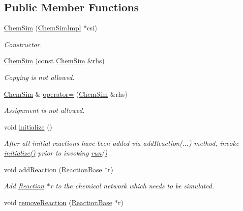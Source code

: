 \subsection*{Public Member Functions}
\begin{DoxyCompactItemize}
\item 
\hyperlink{classchem_1_1ChemSim_a650a80164d4545c984feae82929ea6d6}{Chem\-Sim} (\hyperlink{classchem_1_1ChemSimImpl}{Chem\-Sim\-Impl} $\ast$csi)
\begin{DoxyCompactList}\small\item\em Constructor. \end{DoxyCompactList}\item 
\hyperlink{classchem_1_1ChemSim_a3913850f42c21b7d047b4516bab90293}{Chem\-Sim} (const \hyperlink{classchem_1_1ChemSim}{Chem\-Sim} \&rhs)
\begin{DoxyCompactList}\small\item\em Copying is not allowed. \end{DoxyCompactList}\item 
\hyperlink{classchem_1_1ChemSim}{Chem\-Sim} \& \hyperlink{classchem_1_1ChemSim_a80f99f736b36adacb3888052f6ab933d}{operator=} (\hyperlink{classchem_1_1ChemSim}{Chem\-Sim} \&rhs)
\begin{DoxyCompactList}\small\item\em Assignment is not allowed. \end{DoxyCompactList}\item 
void \hyperlink{classchem_1_1ChemSim_a691cc53afccbda480a674b7f3014ac72}{initialize} ()
\begin{DoxyCompactList}\small\item\em After all initial reactions have been added via add\-Reaction(...) method, invoke \hyperlink{classchem_1_1ChemSim_a691cc53afccbda480a674b7f3014ac72}{initialize()} prior to invoking \hyperlink{classchem_1_1ChemSim_a1cc6ec051c2f0124bfa327816443b24b}{run()} \end{DoxyCompactList}\item 
void \hyperlink{classchem_1_1ChemSim_a5e3df263e6dc6f2b6c174bd6b5cddee9}{add\-Reaction} (\hyperlink{classchem_1_1ReactionBase}{Reaction\-Base} $\ast$r)
\begin{DoxyCompactList}\small\item\em Add \hyperlink{classchem_1_1Reaction}{Reaction} $\ast$r to the chemical network which needs to be simulated. \end{DoxyCompactList}\item 
void \hyperlink{classchem_1_1ChemSim_a1949fb943a9e5e463d39122c29827e06}{remove\-Reaction} (\hyperlink{classchem_1_1ReactionBase}{Reaction\-Base} $\ast$r)

\end{DoxyCompactItemize}
